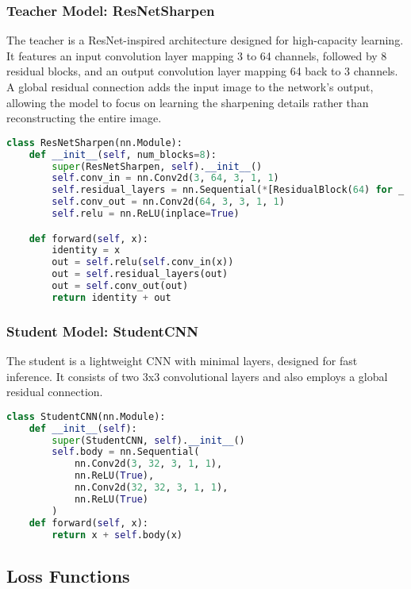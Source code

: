 \documentclass[12pt,a4paper]{article}
\begin{document}
\subsubsection{Teacher Model: ResNetSharpen}
The teacher is a ResNet-inspired architecture designed for high-capacity learning. It features an input convolution layer mapping 3 to 64 channels, followed by 8 residual blocks, and an output convolution layer mapping 64 back to 3 channels. A global residual connection adds the input image to the network's output, allowing the model to focus on learning the sharpening details rather than reconstructing the entire image.

\begin{lstlisting}[language=Python, caption={ResNetSharpen Teacher Model Architecture}]
class ResNetSharpen(nn.Module):
    def __init__(self, num_blocks=8):
        super(ResNetSharpen, self).__init__()
        self.conv_in = nn.Conv2d(3, 64, 3, 1, 1)
        self.residual_layers = nn.Sequential(*[ResidualBlock(64) for _ in range(num_blocks)])
        self.conv_out = nn.Conv2d(64, 3, 3, 1, 1)
        self.relu = nn.ReLU(inplace=True)

    def forward(self, x):
        identity = x
        out = self.relu(self.conv_in(x))
        out = self.residual_layers(out)
        out = self.conv_out(out)
        return identity + out
\end{lstlisting}

\subsubsection{Student Model: StudentCNN}
The student is a lightweight CNN with minimal layers, designed for fast inference. It consists of two 3x3 convolutional layers and also employs a global residual connection.

\begin{lstlisting}[language=Python, caption={StudentCNN Architecture}]
class StudentCNN(nn.Module):
    def __init__(self):
        super(StudentCNN, self).__init__()
        self.body = nn.Sequential(
            nn.Conv2d(3, 32, 3, 1, 1),
            nn.ReLU(True),
            nn.Conv2d(32, 32, 3, 1, 1),
            nn.ReLU(True)
        )
    def forward(self, x):
        return x + self.body(x)
\end{lstlisting}

\subsection{Loss Functions}
\end{document}
